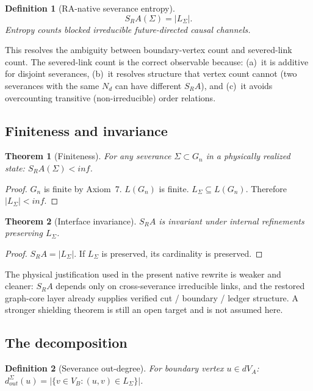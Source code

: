 \documentclass[11pt]{article}
\def\mathrm#1{#1}%
\def\infty{inf}%
\def\partial{d}%
\def\SRa{S_RA}%
\newtheorem{definition}{Definition}
\newtheorem{theorem}{Theorem}
\newcommand{\SRa}{S_{\mathrm{RA}}}
\begin{document}
\begin{definition}[RA-native severance entropy]
\begin{equation}
\boxed{\SRa(\Sigma)=|L_\Sigma|.}
\end{equation}
Entropy counts blocked irreducible future-directed causal channels.
\end{definition}

This resolves the ambiguity between boundary-vertex count and severed-link count. The severed-link count is the correct observable because: (a)~it is additive for disjoint severances, (b)~it resolves structure that vertex count cannot (two severances with the same $N_\partial$ can have different $\SRa$), and (c)~it avoids overcounting transitive (non-irreducible) order relations.

\subsection{Finiteness and invariance}

\begin{theorem}[Finiteness]
For any severance $\Sigma\subset G_n$ in a physically realized state: $\SRa(\Sigma)<\infty$.
\end{theorem}
\begin{proof}
$G_n$ is finite by Axiom~7. $L(G_n)$ is finite. $L_\Sigma\subseteq L(G_n)$. Therefore $|L_\Sigma|<\infty$.
\end{proof}

\begin{theorem}[Interface invariance]
$\SRa$ is invariant under internal refinements preserving $L_\Sigma$.
\end{theorem}
\begin{proof}
$\SRa=|L_\Sigma|$. If $L_\Sigma$ is preserved, its cardinality is preserved.
\end{proof}

The physical justification used in the present native rewrite is weaker and cleaner: $\SRa$ depends only on cross-severance irreducible links, and the restored graph-core layer already supplies verified cut / boundary / ledger structure. A stronger shielding theorem is still an open target and is not assumed here.

\subsection{The decomposition}

\begin{definition}[Severance out-degree]
For boundary vertex $u\in\partial V_A$: $d_{\mathrm{out}}^\Sigma(u)=|\{v\in V_B:(u,v)\in L_\Sigma\}|$.
\end{definition}
\end{document}
